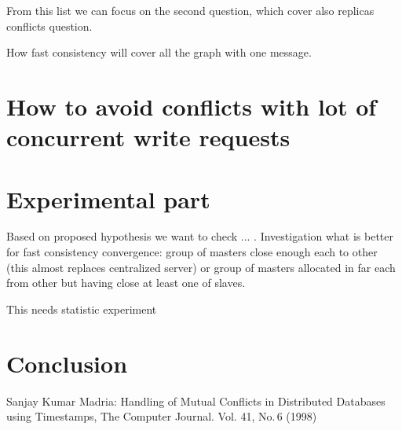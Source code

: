 \documentclass{llncs}
\begin{document}
From this list we can focus on the second question, which cover also replicas conflicts question.

How fast consistency will cover all the graph with one message.
\section{How to avoid conflicts with lot of concurrent write requests}
\section{Experimental part}\label{sec:experiments}
Based on proposed hypothesis we want to check ... .
Investigation what is better for fast consistency convergence:
group of masters close enough each to other (this almost replaces centralized server)
or group of masters allocated in far each from other but having close at least one of slaves.

This needs statistic experiment

\section{Conclusion}

\begin{thebibliography}{99}

Sanjay Kumar Madria: 
Handling of Mutual Conflicts in Distributed Databases using Timestamps,
The Computer Journal. Vol. 41, No.\,6 (1998) 

\end{thebibliography}
\end{document}
